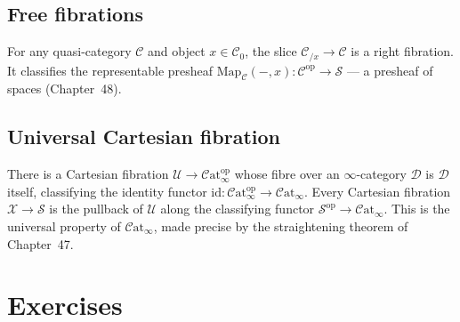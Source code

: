 \subsection{Free fibrations}

\begin{example_thm}
\label{ex:free-fib}
For any quasi-category $\mathcal{C}$ and object $x \in \mathcal{C}_0$,
the slice $\mathcal{C}_{/x} \to \mathcal{C}$ is a right fibration. It
classifies the representable presheaf $\mathrm{Map}_\mathcal{C}(-, x) :
\mathcal{C}^{\mathrm{op}} \to \mathcal{S}$ — a presheaf of spaces (Chapter~48).
\end{example_thm}

\subsection{Universal Cartesian fibration}

\begin{remark}
\label{rem:universal-cart}
There is a Cartesian fibration $\mathcal{U} \to \mathcal{C}\mathrm{at}_\infty^{\mathrm{op}}$
whose fibre over an $\infty$-category $\mathcal{D}$ is $\mathcal{D}$
itself, classifying the identity functor
$\mathrm{id} : \mathcal{C}\mathrm{at}_\infty^{\mathrm{op}} \to
\mathcal{C}\mathrm{at}_\infty$. Every Cartesian fibration $\mathcal{X} \to
\mathcal{S}$ is the pullback of $\mathcal{U}$ along the classifying functor
$\mathcal{S}^{\mathrm{op}} \to \mathcal{C}\mathrm{at}_\infty$. This is
the universal property of $\mathcal{C}\mathrm{at}_\infty$, made precise
by the straightening theorem of Chapter~47.
\end{remark}


\section{Exercises}
\label{sec:fibration-exercises}

